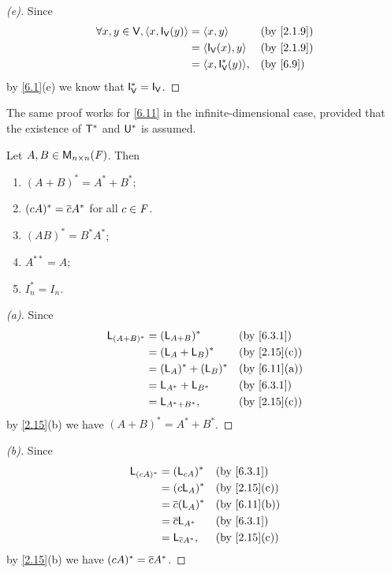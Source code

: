 \begin{proof}[(e)]
  Since
  \begin{align*}
    \forall x, y \in \V, \inn{x, \IT[\V](y)} & = \inn{x, y}             &  & \by{2.1.9} \\
                                             & = \inn{\IT[\V](x), y}    &  & \by{2.1.9} \\
                                             & = \inn{x, \IT[\V]^*(y)}, &  & \by{6.9}
  \end{align*}
  by \cref{6.1}(e) we know that \(\IT[\V]^* = \IT[\V]\).
\end{proof}

\begin{note}
  The same proof works for \cref{6.11} in the infinite-dimensional case, provided that the existence of \(\mathsf{T}^*\) and \(\mathsf{U}^*\) is assumed.
\end{note}

\begin{cor}\label{6.3.2}
  Let \(A, B \in \ms[n][n][\F]\).
  Then
  \begin{enumerate}
    \item \((A + B)^* = A^* + B^*\);
    \item \((cA)^* = \overline{c} A^*\) for all \(c \in \mathit{F}\).
    \item \((AB)^* = B^* A^*\);
    \item \(A^{**} = A\);
    \item \(I_n^* = I_n\).
  \end{enumerate}
\end{cor}

\begin{proof}[(a)]
  Since
  \begin{align*}
    \L_{(A + B)^*} & = (\L_{A + B})^*      &  & \by{6.3.1}   \\
                   & = (\L_A + \L_B)^*     &  & \by{2.15}[c] \\
                   & = (\L_A)^* + (\L_B)^* &  & \by{6.11}[a] \\
                   & = \L_{A^*} + \L_{B^*} &  & \by{6.3.1}   \\
                   & = \L_{A^* + B^*},     &  & \by{2.15}[c]
  \end{align*}
  by \cref{2.15}(b) we have \((A + B)^* = A^* + B^*\).
\end{proof}

\begin{proof}[(b)]
  Since
  \begin{align*}
    \L_{(cA)^*} & = (\L_{cA})^*        &  & \by{6.3.1}   \\
                & = (c \L_A)^*         &  & \by{2.15}[c] \\
                & = \conj{c} (\L_A)^*  &  & \by{6.11}[b] \\
                & = \conj{c} \L_{A^*}  &  & \by{6.3.1}   \\
                & = \L_{\conj{c} A^*}, &  & \by{2.15}[c]
  \end{align*}
  by \cref{2.15}(b) we have \((cA)^* = \overline{c} A^*\).
\end{proof}

